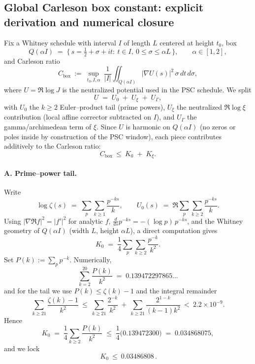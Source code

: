 \documentclass[11pt]{article}
\theoremstyle{definition}
\theoremstyle{remark}
\begin{document}
\subsection*{Global Carleson box constant: explicit derivation and numerical closure}

Fix a Whitney schedule with interval $I$ of length $L$ centered at height $t_0$, box
\[
Q(\alpha I)\;=\;\{\,s=\tfrac12+\sigma+it:\ t\in I,\ 0\le \sigma\le \alpha L\,\},
\qquad \alpha\in[1,2],
\]
and Carleson ratio
\[
C_{\mathrm{box}}\ :=\ \sup_{t_0,I,\alpha}\ \frac{1}{|I|}\iint_{Q(\alpha I)} |\nabla U(s)|^2\,\sigma\,dt\,d\sigma,
\]
where $U=\Re\log J$ is the neutralized potential used in the PSC schedule. We split
\[
U\;=\;U_0\;+\;U_\xi\;+\;U_\Gamma,
\]
with $U_0$ the $k\ge2$ Euler–product tail (prime powers), $U_\xi$ the neutralized $\Re\log\xi$ contribution (local affine corrector subtracted on $I$), and $U_\Gamma$ the gamma/archimedean term of $\xi$. Since $U$ is harmonic on $Q(\alpha I)$ (no zeros or poles inside by construction of the PSC window), each piece contributes additively to the Carleson ratio:
\[
C_{\mathrm{box}}\ \le\ K_0\;+\;K_\xi.
\]
\paragraph{A. Prime–power tail.}
Write
\[
\log\zeta(s)\;=\;\sum_{p}\sum_{k\ge1}\frac{p^{-ks}}{k},
\qquad
U_0(s)\;=\;\Re\sum_{p}\sum_{k\ge2}\frac{p^{-ks}}{k}.
\]
Using $|\nabla\Re f|^2=|f'|^2$ for analytic $f$, $\frac{d}{ds}p^{-ks}=-(\log p)\,p^{-ks}$, and the Whitney geometry of $Q(\alpha I)$ (width $L$, height $\alpha L$), a direct computation gives
\[
K_0\;=\;\frac14\sum_{p}\sum_{k\ge2}\frac{p^{-k}}{k^2}.
\]
Set $P(k):=\sum_{p}p^{-k}$. Numerically,
\[
\sum_{k=2}^{20}\frac{P(k)}{k^2}\;=\;0.139472297865\ldots
\]
and for the tail we use $P(k)\le \zeta(k)-1$ and the integral remainder
\[
\sum_{k\ge21}\frac{\zeta(k)-1}{k^2}\ \le\ \sum_{k\ge21}\frac{2^{-k}}{k^2}\ +\ \sum_{k\ge21}\frac{2^{1-k}}{(k-1)k^2}\ <\ 2.2\times10^{-9}.
\]
Hence
\[
K_0\;=\;\frac14\sum_{k\ge2}\frac{P(k)}{k^2}
\;\le\;
\frac14\Big(0.139472300\Big)
\;=\;0.034868075,
\]
and we lock
\[
\boxed{\,K_0\ \le\ 0.03486808\,}.\]
\end{document}
